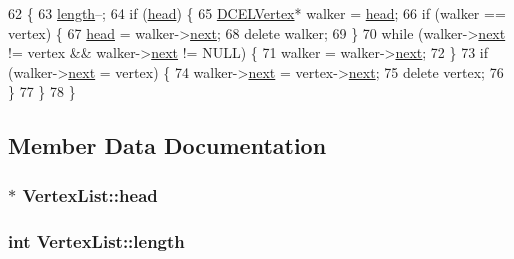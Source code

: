 \begin{DoxyCode}
62 \{
63     \hyperlink{classVertexList_a99fe4395d1c973a38e5e830909175f34}{length}--;
64     \textcolor{keywordflow}{if} (\hyperlink{classVertexList_a1816fa2e1ce89953d2ec57b19f25c45a}{head}) \{
65         \hyperlink{classDCELVertex}{DCELVertex}* walker = \hyperlink{classVertexList_a1816fa2e1ce89953d2ec57b19f25c45a}{head};
66         \textcolor{keywordflow}{if} (walker == vertex) \{
67             \hyperlink{classVertexList_a1816fa2e1ce89953d2ec57b19f25c45a}{head} = walker->\hyperlink{classDCELVertex_a5eadf032ea2d74d0448e26aede36aaf0}{next};
68             \textcolor{keyword}{delete} walker;
69         \}
70         \textcolor{keywordflow}{while} (walker->\hyperlink{classDCELVertex_a5eadf032ea2d74d0448e26aede36aaf0}{next} != vertex && walker->\hyperlink{classDCELVertex_a5eadf032ea2d74d0448e26aede36aaf0}{next} != NULL) \{
71             walker = walker->\hyperlink{classDCELVertex_a5eadf032ea2d74d0448e26aede36aaf0}{next};
72         \}
73         \textcolor{keywordflow}{if} (walker->\hyperlink{classDCELVertex_a5eadf032ea2d74d0448e26aede36aaf0}{next} = vertex) \{
74             walker->\hyperlink{classDCELVertex_a5eadf032ea2d74d0448e26aede36aaf0}{next} = vertex->\hyperlink{classDCELVertex_a5eadf032ea2d74d0448e26aede36aaf0}{next};
75             \textcolor{keyword}{delete} vertex;
76         \}
77     \}
78 \}
\end{DoxyCode}


\subsection{Member Data Documentation}
\subsubsection[{\texorpdfstring{head}{head}}]{$\ast$ Vertex\+List\+::head}\hypertarget{classVertexList_a1816fa2e1ce89953d2ec57b19f25c45a}{}\label{classVertexList_a1816fa2e1ce89953d2ec57b19f25c45a}
\subsubsection[{\texorpdfstring{length}{length}}]{\setlength{\rightskip}{0pt plus 5cm}int Vertex\+List\+::length}\hypertarget{classVertexList_a99fe4395d1c973a38e5e830909175f34}{}\label{classVertexList_a99fe4395d1c973a38e5e830909175f34}
